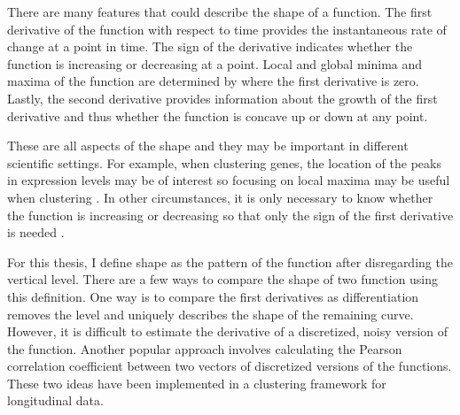 There are many features that could describe the shape of a function. The first derivative of the function with respect to time provides the instantaneous rate of change at a point in time. The sign of the derivative indicates whether the function is increasing or decreasing at a point.  Local and global minima and maxima of the function are determined by where the first derivative is zero. Lastly, the second derivative provides information about the growth of the first derivative and thus whether the function is concave up or down at any point. 

These are all aspects of the shape and they may be important in different scientific settings. For example, when clustering genes, the location of the peaks in expression levels may be of interest so focusing on local maxima may be useful when clustering \cite{luan2003}. In other circumstances, it is only necessary to know whether the function is increasing or decreasing so that only the sign of the first derivative is needed \cite{phang2003}. 

For this thesis, I define shape as the pattern of the function after disregarding the vertical level. There are a few ways to compare the shape of two function using this definition. One way is to compare the first derivatives as differentiation removes the level and uniquely describes the shape of the remaining curve. However, it is difficult to estimate the derivative of a discretized, noisy version of the function. Another popular approach involves calculating the Pearson correlation coefficient between two vectors of discretized versions of the functions. These two ideas have been implemented in a clustering framework for longitudinal data.


